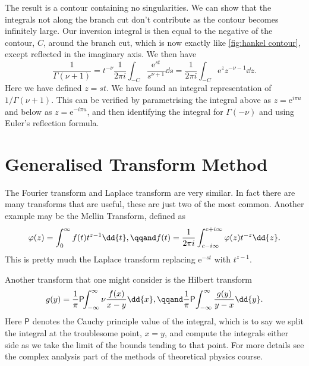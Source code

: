 \documentclass[fleqn]{NotesClass}
\newcommand*{\e}{\mathrm{e}}
\begin{document}
    The result is a contour containing no singularities.
    We can show that the integrals not along the branch cut don't contribute as the contour becomes infinitely large.
    Our inversion integral is then equal to the negative of the contour, \(C\), around the branch cut, which is now exactly like \cref{fig:hankel contour}, except reflected in the imaginary axis.
    We then have
    \begin{equation}
        \frac{1}{\Gamma(\nu + 1)} = t^{-\nu} \frac{1}{2\pi i} \int_{-C} \frac{\e^{st}}{s^{\nu + 1}} \dd{s} = \frac{1}{2\pi i} \int_{-C} \e^{z}z^{-\nu - 1} \dd{z}.
    \end{equation}
    Here we have defined \(z = st\).
    We have found an integral representation of \(1/\Gamma(\nu + 1)\).
    This can be verified by parametrising the integral above as \(z = \e^{i\pi u}\) and below as \(z = \e^{-i\pi u}\), and then identifying the integral for \(\Gamma(-\nu)\) and using Euler's reflection formula.
    
    \chapter{Generalised Transform Method}
    The Fourier transform and Laplace transform are very similar.
    In fact there are many transforms that are useful, these are just two of the most common.
    Another example may be the Mellin Transform, defined as
    \begin{equation}
        \varphi(z) = \int_{0}^{\infty} f(t) t^{z-1} \dd{t}, \qqand f(t) = \frac{1}{2\pi i} \int_{c - i\infty}^{c + i\infty} \varphi(z) t^{-z} \dd{z}.
    \end{equation}
    This is pretty much the Laplace transform replacing \(\e^{-st}\) with \(t^{z - 1}\).
    
    Another transform that one might consider is the Hilbert transform
    \begin{equation}
        g(y) = \frac{1}{\pi} \mathsf{P} \!\! \int_{-\infty}^{\infty}\nu\frac{f(x)}{x - y} \dd{x}, \qqand \frac{1}{\pi} \mathsf{P} \! \int_{-\infty}^{\infty} \frac{g(y)}{y - x} \dd{y}.
    \end{equation}
    Here \(\mathsf{P}\) denotes the Cauchy principle value of the integral, which is to say we split the integral at the troublesome point, \(x = y\), and compute the integrals either side as we take the limit of the bounds tending to that point.
    For more details see the complex analysis part of the methods of theoretical physics course.
    
\end{document}
